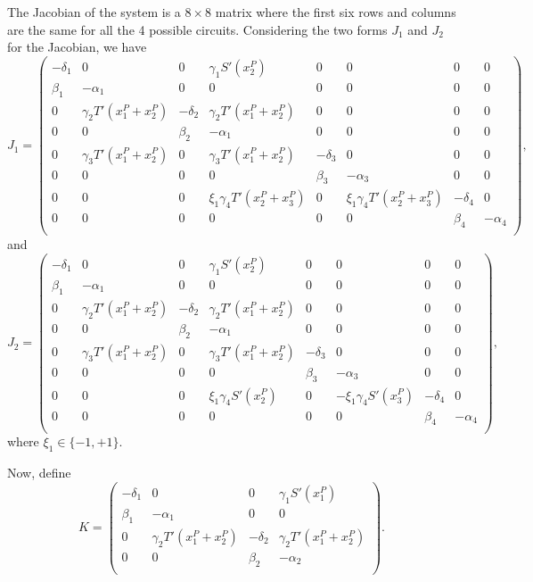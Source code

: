 The Jacobian of the system is a $8 \times 8$ matrix where the 
first six rows and columns are the same for all the 4 possible 
circuits. Considering the two forms $J_1$ and $J_2$ for the 
Jacobian, we have 
\begin{equation}
    J_1 = 
    \begin{pmatrix}
        -\delta_1 & 0 & 0 & \gamma_1 S'(x_2^P) & 0 & 0 & 0 & 0 \\
        \beta_1 & -\alpha_1 & 0 & 0 & 0 & 0 & 0 & 0 \\
        0 & \gamma_2 T'(x_1^P + x_2^P) & -\delta_2 & \gamma_2 T'(x_1^P + x_2^P) & 0 & 0 & 0 & 0 \\
        0 & 0 & \beta_2 & -\alpha_1 & 0 & 0 & 0 & 0 \\
        0 & \gamma_3 T'(x_1^P + x_2^P) & 0 & \gamma_3 T'(x_1^P + x_2^P) & -\delta_3 & 0 & 0 & 0 \\
        0 & 0 & 0 & 0 & \beta_3 & -\alpha_3 & 0 & 0 \\
        0 & 0 & 0 & \xi_1 \gamma_4 T'(x_2^P + x_3^P) & 0 & \xi_1 \gamma_4 T'(x_2^P + x_3^P) & -\delta_4 & 0 \\
        0 & 0 & 0 & 0 & 0 & 0 & \beta_4 & -\alpha_4 \\
    \end{pmatrix},
\end{equation} 
and 
\begin{equation}
    J_2 = 
    \begin{pmatrix}
        -\delta_1 & 0 & 0 & \gamma_1 S'(x_2^P) & 0 & 0 & 0 & 0 \\
        \beta_1 & -\alpha_1 & 0 & 0 & 0 & 0 & 0 & 0 \\
        0 & \gamma_2 T'(x_1^P + x_2^P) & -\delta_2 & \gamma_2 T'(x_1^P + x_2^P) & 0 & 0 & 0 & 0 \\
        0 & 0 & \beta_2 & -\alpha_1 & 0 & 0 & 0 & 0 \\
        0 & \gamma_3 T'(x_1^P + x_2^P) & 0 & \gamma_3 T'(x_1^P + x_2^P) & -\delta_3 & 0 & 0 & 0 \\
        0 & 0 & 0 & 0 & \beta_3 & -\alpha_3 & 0 & 0 \\
        0 & 0 & 0 & \xi_1 \gamma_4 S'(x_2^P) & 0 & -\xi_1 \gamma_4 S'(x_3^P) & -\delta_4 & 0 \\
        0 & 0 & 0 & 0 & 0 & 0 & \beta_4 & -\alpha_4 \\
    \end{pmatrix},
\end{equation} 
where $\xi_1 \in \{ -1, +1 \}$.

Now, define
\begin{equation}
K = 
    \begin{pmatrix}
        -\delta_1 & 0 & 0 & \gamma_1S'(x_1^P) \\
        \beta_1 & -\alpha_1 & 0 & 0 \\
        0 & \gamma_2 T'(x_1^P + x_2^P) & -\delta_2 & \gamma_2 T'(x_1^P + x_2^P) \\
        0 & 0 & \beta_2 & -\alpha_2 \\
    \end{pmatrix}.
\end{equation}

